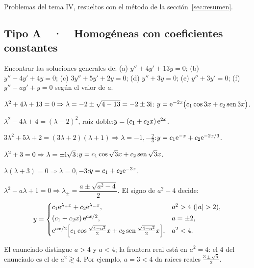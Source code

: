 \documentclass[11pt,twoside]{article}
\newcommand\abs[1]{\lvert#1\rvert}
\begin{document}
Problemas del tema IV, resueltos con el método de la sección~\ref{sec:resumen}.

\subsection{Tipo A\ \ ·\ \ Homogéneas con coeficientes constantes}

\begin{problema}\label{prob:1}
Encontrar las soluciones generales de: (a) $y''+4y'+13y=0$; (b) $y''-4y'+4y=0$; (c) $3y''+5y'+2y=0$;
(d) $y''+3y=0$; (e) $y''+3y'=0$; (f) $y''-ay'+y=0$ según el valor de $a$.
\end{problema}
\begin{resolucion}
\begin{pasos}
\item $\lambda^2+4\lambda+13=0\Rightarrow\lambda=-2\pm\sqrt{4-13}=-2\pm3\mathrm{i}$:\quad
$y=\mathrm{e}^{-2x}\big(c_1\cos3x+c_2\operatorname{sen}3x\big)$.
\item $\lambda^2-4\lambda+4=(\lambda-2)^2$, raíz doble:\quad $y=(c_1+c_2x)\,\mathrm{e}^{2x}$.
\item $3\lambda^2+5\lambda+2=(3\lambda+2)(\lambda+1)\Rightarrow\lambda=-1,-\tfrac23$:\quad $y=c_1\mathrm{e}^{-x}+c_2\mathrm{e}^{-2x/3}$.
\item $\lambda^2+3=0\Rightarrow\lambda=\pm\mathrm{i}\sqrt3$:\quad $y=c_1\cos\sqrt3x+c_2\operatorname{sen}\sqrt3x$.
\item $\lambda(\lambda+3)=0\Rightarrow\lambda=0,-3$:\quad $y=c_1+c_2\mathrm{e}^{-3x}$.
\item $\lambda^2-a\lambda+1=0\Rightarrow\lambda_\pm=\dfrac{a\pm\sqrt{a^2-4}}{2}$. El signo de $a^2-4$ decide:
\begin{equation*}
y=\begin{cases}
c_1\e^{\lambda_+x}+c_2\e^{\lambda_-x}, & a^2>4\ (\abs a>2),\\[2pt]
(c_1+c_2x)\,\e^{ax/2}, & a=\pm2,\\[2pt]
\e^{ax/2}\Big[c_1\cos\tfrac{\sqrt{4-a^2}}{2}x+c_2\sen\tfrac{\sqrt{4-a^2}}{2}x\Big], & a^2<4 .
\end{cases}
\end{equation*}
\end{pasos}
El enunciado distingue $a>4$ y $a<4$; la frontera real está en $a^2=4$: el $4$ del enunciado es el de $a^2\gtrless4$.
Por ejemplo, $a=3<4$ da raíces reales $\frac{3\pm\sqrt5}{2}$.
\end{resolucion}
\end{document}
